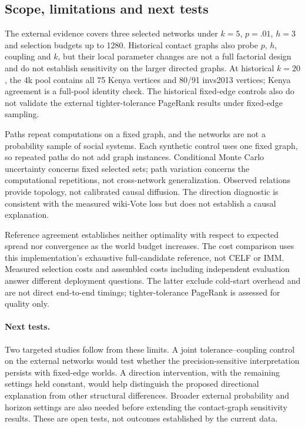 \documentclass[smallextended]{svjour3}
\begin{document}
\subsection{Scope, limitations and next tests}
The external evidence covers three selected networks under $k=5$, $p=.01$, $h=3$ and selection budgets up to 1280. Historical contact graphs also probe $p$, $h$, coupling and $k$, but their local parameter changes are not a full factorial design and do not establish sensitivity on the larger directed graphs. At historical $k=20$, the 4k pool contains all 75 Kenya vertices and 80/91 invs2013 vertices; Kenya agreement is a full-pool identity check. The historical fixed-edge controls also do not validate the external tighter-tolerance PageRank results under fixed-edge sampling.

Paths repeat computations on a fixed graph, and the networks are not a probability sample of social systems. Each synthetic control uses one fixed graph, so repeated paths do not add graph instances. Conditional Monte Carlo uncertainty concerns fixed selected sets; path variation concerns the computational repetitions, not cross-network generalization. Observed relations provide topology, not calibrated causal diffusion. The direction diagnostic is consistent with the measured wiki-Vote loss but does not establish a causal explanation.

Reference agreement establishes neither optimality with respect to expected spread nor convergence as the world budget increases. The cost comparison uses this implementation's exhaustive full-candidate reference, not CELF or IMM. Measured selection costs and assembled costs including independent evaluation answer different deployment questions. The latter exclude cold-start overhead and are not direct end-to-end timings; tighter-tolerance PageRank is assessed for quality only.

\paragraph{Next tests.} Two targeted studies follow from these limits. A joint tolerance--coupling control on the external networks would test whether the precision-sensitive interpretation persists with fixed-edge worlds. A direction intervention, with the remaining settings held constant, would help distinguish the proposed directional explanation from other structural differences. Broader external probability and horizon settings are also needed before extending the contact-graph sensitivity results. These are open tests, not outcomes established by the current data.
\end{document}
